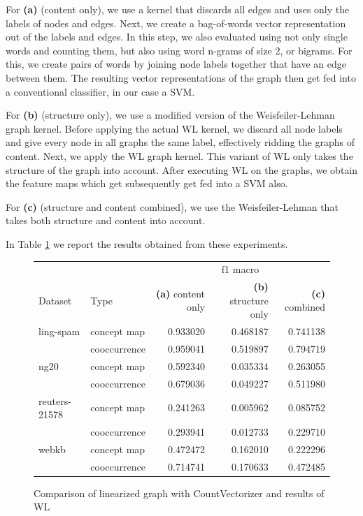 For \textbf{(a)} (content only), we use a kernel that discards all edges and uses only the labels of nodes and edges. Next, we create a bag-of-words vector representation out of the labels and edges.
In this step, we also evaluated using not only single words and counting them, but also using word n-grams of size 2, or bigrams.
For this, we create pairs of words by joining node labels together that have an edge between them.
The resulting vector representations of the graph then get fed into a conventional classifier, in our case a SVM.

For \textbf{(b)} (structure only), we use a modified version of the Weisfeiler-Lehman graph kernel. Before applying the actual WL kernel, we discard all node labels and give every node in all graphs the same label, effectively ridding the graphs of content. Next, we apply the WL graph kernel. This variant of WL only takes the structure of the graph into account.
After executing WL on the graphs, we obtain the feature maps which get subsequently get fed into a SVM also.

For \textbf{(c)} (structure and content combined), we use the Weisfeiler-Lehman that takes both structure and content into account.

In Table \ref{fig:table-results-structure-vs-content} we report the results obtained from these experiments.

\begin{figure}[ht]
\centering
\begin{tabular}{llrrr}
          & & \multicolumn{3}{c}{f1 macro} \\
Dataset & Type & \textbf{(a)} content only & \textbf{(b)} structure only & \textbf{(c)} combined\\
\midrule
ling-spam & concept map &  0.933020 &  0.468187 &  0.741138 \\
          & cooccurrence &  0.959041 &  0.519897 &  0.794719 \\
\midrule
ng20 & concept map &  0.592340 &  0.035334 &  0.263055 \\
          & cooccurrence &  0.679036 &  0.049227 &  0.511980 \\
\midrule
reuters-21578 & concept map &  0.241263 &  0.005962 &  0.085752 \\
          & cooccurrence &  0.293941 &  0.012733 &  0.229710 \\
\midrule
webkb & concept map &  0.472472 &  0.162010 &  0.222296 \\
          & cooccurrence &  0.714741 &  0.170633 &  0.472485 \\
\bottomrule
\end{tabular}
\caption{Comparison of linearized graph with CountVectorizer and results of WL}\label{fig:table-results-structure-vs-content}
\end{figure}

